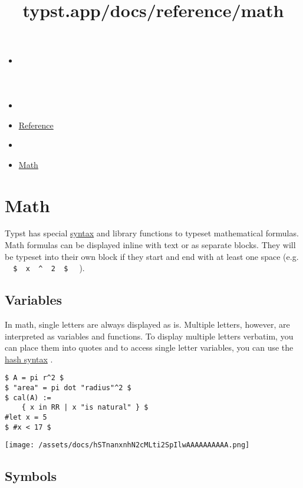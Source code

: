 \title{typst.app/docs/reference/math}

\begin{itemize}
\tightlist
\item
  \href{/docs}{}
\item
  
\item
  \href{/docs/reference/}{Reference}
\item
  
\item
  \href{/docs/reference/math/}{Math}
\end{itemize}

\section{Math}\label{summary}

Typst has special \href{/docs/reference/syntax/\#math}{syntax} and
library functions to typeset mathematical formulas. Math formulas can be
displayed inline with text or as separate blocks. They will be typeset
into their own block if they start and end with at least one space (e.g.
\texttt{\ }{\texttt{\ \$\ }}\texttt{\ x\ }{\texttt{\ \^{}\ }}\texttt{\ 2\ }{\texttt{\ \$\ }}\texttt{\ }
).

\subsection{Variables}\label{variables}

In math, single letters are always displayed as is. Multiple letters,
however, are interpreted as variables and functions. To display multiple
letters verbatim, you can place them into quotes and to access single
letter variables, you can use the
\href{/docs/reference/scripting/\#expressions}{hash syntax} .

\begin{verbatim}
$ A = pi r^2 $
$ "area" = pi dot "radius"^2 $
$ cal(A) :=
    { x in RR | x "is natural" } $
#let x = 5
$ #x < 17 $
\end{verbatim}

\texttt{[image: /assets/docs/hSTnanxnhN2cMLti2SpIlwAAAAAAAAAA.png]}

\subsection{Symbols}\label{symbols}

